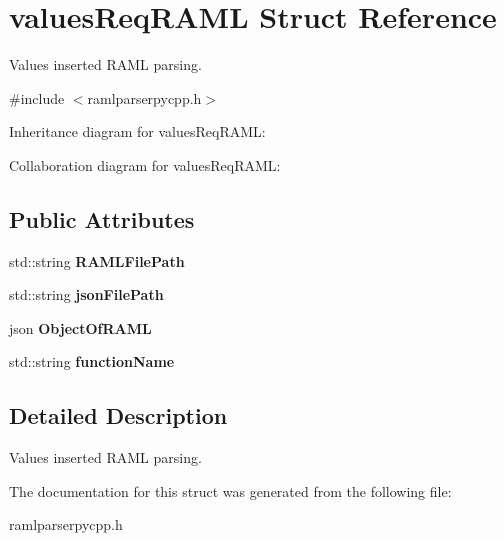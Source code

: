 \hypertarget{structvaluesReqRAML}{}\section{values\+Req\+R\+A\+ML Struct Reference}
\label{structvaluesReqRAML}


Values inserted R\+A\+ML parsing.  




{\ttfamily \#include $<$ramlparserpycpp.\+h$>$}



Inheritance diagram for values\+Req\+R\+A\+ML\+:


Collaboration diagram for values\+Req\+R\+A\+ML\+:
\subsection*{Public Attributes}
\begin{DoxyCompactItemize}
\item 
std\+::string {\bfseries R\+A\+M\+L\+File\+Path}\hypertarget{structvaluesReqRAML_ae25baa48f57d454229a04a0c949f9b1c}{}\label{structvaluesReqRAML_ae25baa48f57d454229a04a0c949f9b1c}

\item 
std\+::string {\bfseries json\+File\+Path}\hypertarget{structvaluesReqRAML_abf309e068f157cbdd0c7ad7e4daad0a4}{}\label{structvaluesReqRAML_abf309e068f157cbdd0c7ad7e4daad0a4}

\item 
json {\bfseries Object\+Of\+R\+A\+ML}\hypertarget{structvaluesReqRAML_acfa0d0656c411c2adbdf95372cd4b7b2}{}\label{structvaluesReqRAML_acfa0d0656c411c2adbdf95372cd4b7b2}

\item 
std\+::string {\bfseries function\+Name}\hypertarget{structvaluesReqRAML_a4b5791561481168d4d6743d4b9f1c175}{}\label{structvaluesReqRAML_a4b5791561481168d4d6743d4b9f1c175}

\end{DoxyCompactItemize}


\subsection{Detailed Description}
Values inserted R\+A\+ML parsing. 

The documentation for this struct was generated from the following file\+:\begin{DoxyCompactItemize}
\item 
ramlparserpycpp.\+h\end{DoxyCompactItemize}
